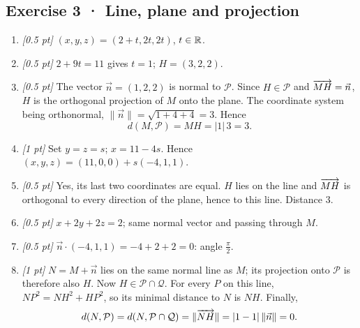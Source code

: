 \subsection*{Exercise 3 · Line, plane and projection}\begin{enumerate}

\item \textit{[0.5 pt]} $(x,y,z)=(2+t,2t,2t)$, $t\in\mathbb R$.

\item \textit{[0.5 pt]} $2+9t=11$ gives $t=1$; $H=(3,2,2)$.

\item \textit{[0.5 pt]} The vector $\vec n=(1,2,2)$ is normal to $\mathcal P$. Since $H\in\mathcal P$ and $\overrightarrow{MH}=\vec n$, $H$ is the orthogonal projection of $M$ onto the plane. The coordinate system being orthonormal, $\|\vec n\|=\sqrt{1+4+4}=3$. Hence
\[d(M,\mathcal P)=MH=|1|\,3=3.\]

\item \textit{[1 pt]} Set $y=z=s$; $x=11-4s$. Hence $(x,y,z)=(11,0,0)+s(-4,1,1)$.

\item \textit{[0.5 pt]} Yes, its last two coordinates are equal. $H$ lies on the line and $\overrightarrow{MH}$ is orthogonal to every direction of the plane, hence to this line. Distance $3$.

\item \textit{[0.5 pt]} $x+2y+2z=2$; same normal vector and passing through $M$.

\item \textit{[0.5 pt]} $\vec n\cdot(-4,1,1)=-4+2+2=0$: angle $\frac{\pi}{2}$.

\item \textit{[1 pt]} $N=M+\vec n$ lies on the same normal line as $M$; its projection onto $\mathcal P$ is therefore also $H$. Now $H\in\mathcal P\cap\mathcal Q$. For every $P$ on this line, $NP^2=NH^2+HP^2$, so its minimal distance to $N$ is $NH$. Finally,
\[d(N,\mathcal P)=d(N,\mathcal P\cap\mathcal Q)=\|\overrightarrow{NH}\|=|1-1|\,\|\vec n\|=0.\]

\end{enumerate}


